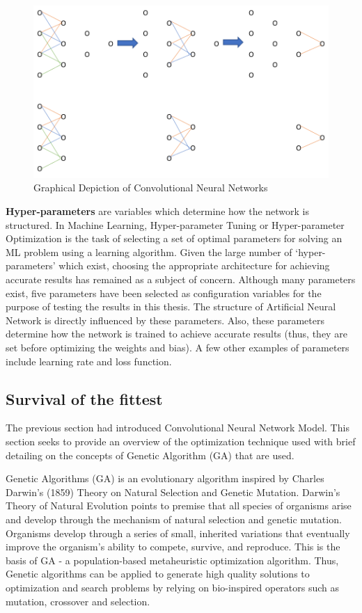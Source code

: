 \begin{figure}
	\centering
	\includegraphics[width=0.8\columnwidth]{introduction/fig1d.png}
	\caption{Graphical Depiction of Convolutional Neural Networks}
\end{figure}

\textbf{Hyper-parameters }are variables which determine how the network is structured. In Machine Learning, Hyper-parameter Tuning or Hyper-parameter Optimization is the task of selecting a set of optimal parameters for solving an ML problem using a learning algorithm. Given the large number of ‘hyper-parameters’ which exist, choosing the appropriate architecture for achieving accurate results has remained as a subject of concern. Although many parameters exist, five parameters have been selected as configuration variables for the purpose of testing the results in this thesis. 
The structure of Artificial Neural Network is directly influenced by these parameters. Also, these parameters determine how the network is trained to achieve accurate results (thus, they are set before optimizing the weights and bias). A few other examples of parameters include learning rate and loss function.


\subsection{Survival of the fittest}

The previous section had introduced Convolutional Neural Network Model. This section seeks to provide an overview of the optimization technique used with brief detailing on the concepts of Genetic Algorithm (GA) that are used. 


Genetic Algorithms (GA) is an evolutionary algorithm inspired by Charles Darwin’s (1859)\cite{darwin2004origin} Theory on Natural Selection and Genetic Mutation. Darwin’s Theory of Natural Evolution points to premise that all species of organisms arise and develop through the mechanism of natural selection and genetic mutation. Organisms develop through a series of small, inherited variations that eventually improve the organism's ability to compete, survive, and reproduce. This is the basis of GA - a population-based metaheuristic optimization algorithm. Thus, Genetic algorithms can be applied to generate high quality solutions to optimization and search problems by relying on bio-inspired operators such as mutation, crossover and selection\cite{mitchell1998introduction}. 

